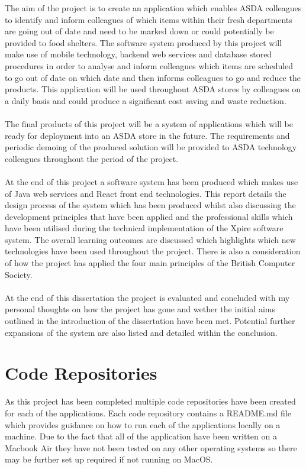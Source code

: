 \documentclass[a4paper,11pt]{report}
\begin{document}
The aim of the project is to create an application which enables ASDA colleagues to identify
and inform colleagues of which items within their fresh departments are going out of date and
need to be marked down or could potentially be provided to food shelters. The software system produced by this project will make use of mobile technology,
 backend web services and database stored procedures in order to analyse and inform colleagues which items are scheduled to go 
out of date on which date and then informs colleagues to go and reduce the products. This application
will be used throughout ASDA stores by colleagues on a daily basis and could produce a significant
cost saving and waste reduction.
\\
\\
The final products of this project will be a system of applications which will be ready for deployment
into an ASDA store in the future. The requirements and periodic demoing of the produced solution will
be provided to ASDA technology colleagues throughout the period of the project.
\\
\\
At the end of this project a software system has been produced which makes use of Java web services and React front end technologies. This report details the design process of the system which has been produced whilst also discussing the development principles that have been applied and the professional skills which have been utilised during the technical implementation of the Xpire software system.
The overall learning outcomes are discussed which highlights which new technologies have been used throughout the project. There is also a consideration of how the project has applied the four main principles of the British Computer Society. 
\\
\\
At the end of this dissertation the project is evaluated and concluded with my personal thoughts on how the project has gone and wether the initial aims outlined in the introduction of the dissertation have been met. Potential further expansions of the system are also listed and detailed within the conclusion. 
\newpage

\chapter*{Code Repositories}
As this project has been completed multiple code repositories have been created for each of the applications.
Each code repository contains a README.md file which provides guidance on how to run each of the applications locally on a machine. Due to the fact that all of the application have been written on a Macbook Air they have not been tested on any other operating systems so there may be further set up required if not running on MacOS.
\end{document}
